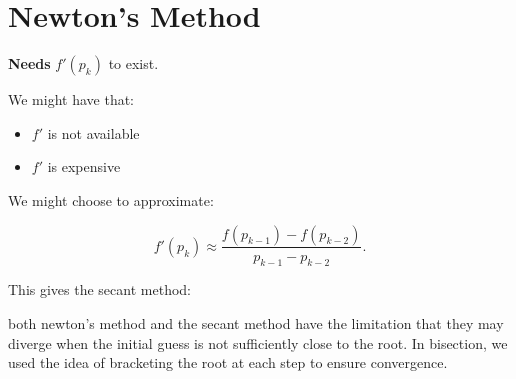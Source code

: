 \usepackage{pgfplots}
\section{Newton's Method}

\textbf{Needs} $f'(p_k)$ to exist.

We might have that:
\begin{itemize}
\item $f'$ is not available
\item $f'$ is expensive
\end{itemize}

We might choose to approximate:

\[
  f'(p_k) \approx \frac{f(p_{k-1})-f(p_{k-2})}{p_{k-1}-p_{k-2}}
.\]

This gives the secant method:

\begin{center}
\end{center}

both newton's method and the secant method have the limitation that they may
diverge when the initial guess is not sufficiently close to the root. In 
bisection, we used the idea of bracketing the root at each step to ensure
convergence. 

